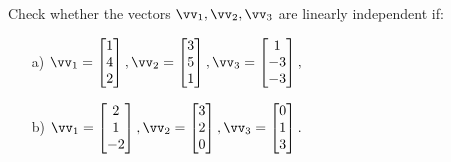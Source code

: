 \begin{problem}
    Check whether the vectors $\vv_1, \vv_2, \vv_3$ are linearly independent if:

    \begin{enumerate}
        \item[a) ] $\vv_1=\begin{bmatrix}
            1 \\ 4 \\ 2
        \end{bmatrix}, \vv_2=\begin{bmatrix}
            3 \\ 5 \\ 1
        \end{bmatrix}, \vv_3=\begin{bmatrix}
            1 \\ -3 \\ -3
        \end{bmatrix}, 
        $
        
        \item[b) ] $\vv_1=\begin{bmatrix}
            2 \\ 1 \\ -2
        \end{bmatrix}, \vv_2=\begin{bmatrix}
            3 \\ 2 \\ 0
        \end{bmatrix}, \vv_3=\begin{bmatrix}
            0 \\ 1 \\ 3
        \end{bmatrix}.
        $
        
    \end{enumerate}
\end{problem}

